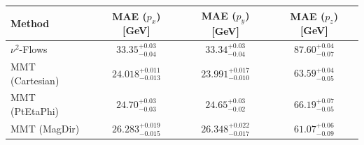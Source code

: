     \begin{tabular}{lccc}
        \toprule
        Method & MAE ($p_x$) [GeV] & MAE ($p_y$) [GeV] & MAE ($p_z$) [GeV] \\
        \midrule
        $\nu^2$-Flows & $33.35^{+0.03}_{-0.04}$ & $33.34^{+0.03}_{-0.04}$ & $87.60^{+0.04}_{-0.07}$ \\
        MMT (Cartesian) & $24.018^{+0.011}_{-0.013}$ & $23.991^{+0.017}_{-0.010}$ & $63.59^{+0.04}_{-0.05}$ \\
        MMT (PtEtaPhi) & $24.70^{+0.03}_{-0.03}$ & $24.65^{+0.03}_{-0.02}$ & $66.19^{+0.07}_{-0.05}$ \\
        MMT (MagDir) & $26.283^{+0.019}_{-0.015}$ & $26.348^{+0.022}_{-0.017}$ & $61.07^{+0.06}_{-0.09}$ \\
        \bottomrule
    \end{tabular}